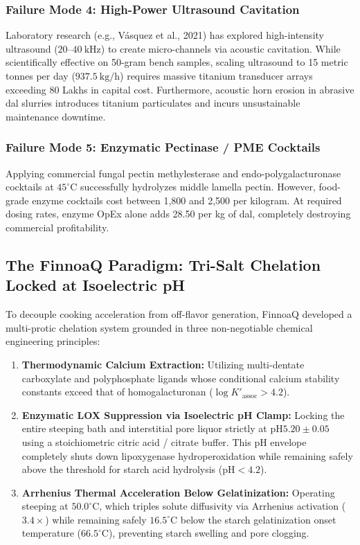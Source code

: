 \documentclass[10pt,a4paper]{article}
\newcommand{\inr}{\text{INR~}}
\begin{document}
\subsubsection{Failure Mode 4: High-Power Ultrasound Cavitation}
Laboratory research (e.g., V\'{a}squez et al., 2021) has explored high-intensity ultrasound ($20\text{--}40\ \mathrm{kHz}$) to create micro-channels via acoustic cavitation. While scientifically effective on 50-gram bench samples, scaling ultrasound to 15 metric tonnes per day ($937.5\ \mathrm{kg/h}$) requires massive titanium transducer arrays exceeding \inr80 Lakhs in capital cost. Furthermore, acoustic horn erosion in abrasive dal slurries introduces titanium particulates and incurs unsustainable maintenance downtime.

\subsubsection{Failure Mode 5: Enzymatic Pectinase / PME Cocktails}
Applying commercial fungal pectin methylesterase and endo-polygalacturonase cocktails at $45^\circ\mathrm{C}$ successfully hydrolyzes middle lamella pectin. However, food-grade enzyme cocktails cost between \inr1,800 and \inr2,500 per kilogram. At required dosing rates, enzyme OpEx alone adds \inr28.50 per kg of dal, completely destroying commercial profitability.

\subsection{The FinnoaQ Paradigm: Tri-Salt Chelation Locked at Isoelectric pH}
To decouple cooking acceleration from off-flavor generation, FinnoaQ developed a multi-protic chelation system grounded in three non-negotiable chemical engineering principles:
\begin{enumerate}[leftmargin=1.5em]
    \item \textbf{Thermodynamic Calcium Extraction:} Utilizing multi-dentate carboxylate and polyphosphate ligands whose conditional calcium stability constants exceed that of homogalacturonan ($\log K'_{\mathrm{assoc}} > 4.2$).
    \item \textbf{Enzymatic LOX Suppression via Isoelectric pH Clamp:} Locking the entire steeping bath and interstitial pore liquor strictly at $\mathrm{pH } 5.20 \pm 0.05$ using a stoichiometric citric acid / citrate buffer. This pH envelope completely shuts down lipoxygenase hydroperoxidation while remaining safely above the threshold for starch acid hydrolysis ($\mathrm{pH } < 4.2$).
    \item \textbf{Arrhenius Thermal Acceleration Below Gelatinization:} Operating steeping at $50.0^\circ\mathrm{C}$, which triples solute diffusivity via Arrhenius activation ($3.4\times$) while remaining safely $16.5^\circ\mathrm{C}$ below the starch gelatinization onset temperature ($66.5^\circ\mathrm{C}$), preventing starch swelling and pore clogging.
\end{enumerate}
\end{document}
